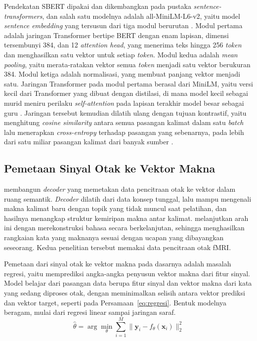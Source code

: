 Pendekatan SBERT dipakai dan dikembangkan pada pustaka \textit{sentence-transformers}, dan salah satu modelnya adalah all-MiniLM-L6-v2, yaitu model \textit{sentence embedding} yang tersusun dari tiga modul berurutan \parencite{sentencetransformers}.
Modul pertama adalah jaringan Transformer bertipe BERT dengan enam lapisan, dimensi tersembunyi 384, dan 12 \textit{attention head}, yang menerima teks hingga 256 \textit{token} dan menghasilkan satu vektor untuk setiap \textit{token}.
Modul kedua adalah \textit{mean pooling}, yaitu merata-ratakan vektor semua \textit{token} menjadi satu vektor berukuran 384.
Modul ketiga adalah normalisasi, yang membuat panjang vektor menjadi satu.
Jaringan Transformer pada modul pertama berasal dari MiniLM, yaitu versi kecil dari Transformer yang dibuat dengan distilasi, di mana model kecil sebagai murid meniru perilaku \textit{self-attention} pada lapisan terakhir model besar sebagai guru \parencite{wang2020minilm}.
Jaringan tersebut kemudian dilatih ulang dengan tujuan kontrastif, yaitu menghitung \textit{cosine similarity} antara semua pasangan kalimat dalam satu \textit{batch} lalu menerapkan \textit{cross-entropy} terhadap pasangan yang sebenarnya, pada lebih dari satu miliar pasangan kalimat dari banyak sumber \parencite{sentencetransformers}.

\subsection{Pemetaan Sinyal Otak ke Vektor Makna}
\label{sec:pemetaan-otak}
\textcite{pereira2018} membangun \textit{decoder} yang memetakan data pencitraan otak ke vektor dalam ruang semantik.
\textit{Decoder} dilatih dari data konsep tunggal, lalu mampu mengenali makna kalimat baru dengan topik yang tidak muncul saat pelatihan, dan hasilnya menangkap struktur kemiripan makna antar kalimat.
\textcite{tang2023} melanjutkan arah ini dengan merekonstruksi bahasa secara berkelanjutan, sehingga menghasilkan rangkaian kata yang maknanya sesuai dengan ucapan yang dibayangkan seseorang.
Kedua penelitian tersebut memakai data pencitraan otak fMRI.

Pemetaan dari sinyal otak ke vektor makna pada dasarnya adalah masalah regresi, yaitu memprediksi angka-angka penyusun vektor makna dari fitur sinyal.
Model belajar dari pasangan data berupa fitur sinyal dan vektor makna dari kata yang sedang diproses otak, dengan meminimalkan selisih antara vektor prediksi dan vektor target, seperti pada Persamaan~\ref{eq:regresi}.
Bentuk modelnya beragam, mulai dari regresi linear sampai jaringan saraf.
\begin{equation}
\hat{\theta} = \arg\min_{\theta} \sum_{i=1}^{M} \lVert \mathbf{y}_i - f_{\theta}(\mathbf{x}_i) \rVert_2^{2}
\label{eq:regresi}
\end{equation}

